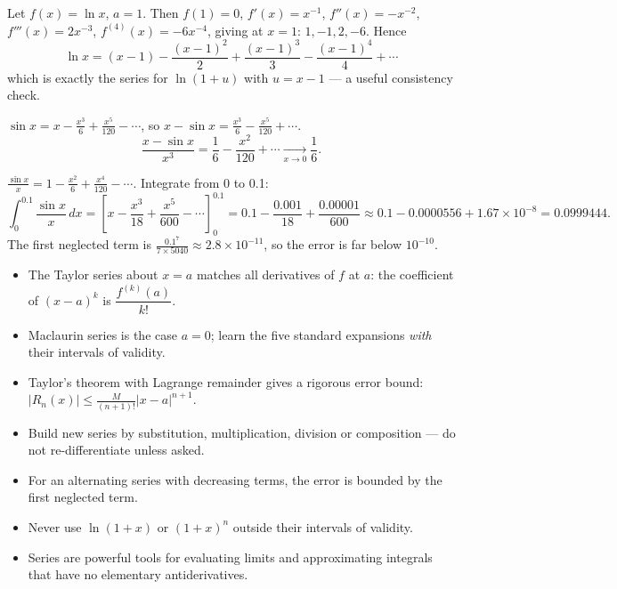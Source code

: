 \documentclass[11pt]{article}
\begin{document}
\begin{corrige}[Exercise 4]
Let $f(x) = \ln x$, $a = 1$. Then $f(1) = 0$, $f'(x) = x^{-1}$, $f''(x) = -x^{-2}$, $f'''(x) = 2x^{-3}$, $f^{(4)}(x) = -6x^{-4}$, giving at $x = 1$: $1, -1, 2, -6$. Hence
\[ \ln x = (x-1) - \frac{(x-1)^2}{2} + \frac{(x-1)^3}{3} - \frac{(x-1)^4}{4} + \cdots \]
which is exactly the series for $\ln(1+u)$ with $u = x - 1$ --- a useful consistency check.
\end{corrige}

\begin{corrige}[Exercise 5]
$\sin x = x - \frac{x^3}{6} + \frac{x^5}{120} - \cdots$, so $x - \sin x = \frac{x^3}{6} - \frac{x^5}{120} + \cdots$.
\[ \frac{x - \sin x}{x^3} = \frac{1}{6} - \frac{x^2}{120} + \cdots \xrightarrow[x\to 0]{} \frac{1}{6}. \]
\end{corrige}

\begin{corrige}[Exercise 6]
$\frac{\sin x}{x} = 1 - \frac{x^2}{6} + \frac{x^4}{120} - \cdots$. Integrate from 0 to 0.1:
\[ \int_0^{0.1} \frac{\sin x}{x}\,dx = \left[ x - \frac{x^3}{18} + \frac{x^5}{600} - \cdots \right]_0^{0.1} = 0.1 - \frac{0.001}{18} + \frac{0.00001}{600} \approx 0.1 - 0.0000556 + 1.67\times 10^{-8} = 0.0999444. \]
The first neglected term is $\frac{0.1^7}{7 \times 5040} \approx 2.8 \times 10^{-11}$, so the error is far below $10^{-10}$.
\end{corrige}

\begin{aretenir}
\begin{itemize}
\item The Taylor series about $x = a$ matches all derivatives of $f$ at $a$: the coefficient of $(x-a)^k$ is $\dfrac{f^{(k)}(a)}{k!}$.
\item Maclaurin series is the case $a = 0$; learn the five standard expansions \emph{with} their intervals of validity.
\item Taylor's theorem with Lagrange remainder gives a rigorous error bound: $|R_n(x)| \le \frac{M}{(n+1)!}|x-a|^{n+1}$.
\item Build new series by substitution, multiplication, division or composition --- do not re-differentiate unless asked.
\item For an alternating series with decreasing terms, the error is bounded by the first neglected term.
\item Never use $\ln(1+x)$ or $(1+x)^n$ outside their intervals of validity.
\item Series are powerful tools for evaluating limits and approximating integrals that have no elementary antiderivatives.
\end{itemize}
\end{aretenir}
\end{document}
